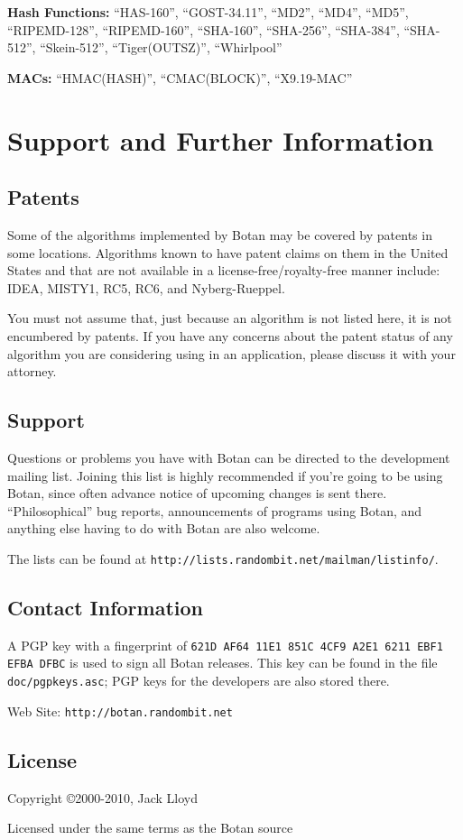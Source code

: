 \documentclass{article}
\newcommand{\filename}[1]{\texttt{#1}}
\newcommand{\url}[1]{\texttt{#1}}
\begin{document}
\noindent
\textbf{Hash Functions:} ``HAS-160'', ``GOST-34.11'',
``MD2'', ``MD4'', ``MD5'', ``RIPEMD-128'', ``RIPEMD-160'',
``SHA-160'', ``SHA-256'', ``SHA-384'', ``SHA-512'', ``Skein-512'',
``Tiger(OUTSZ)'', ``Whirlpool''

\noindent
\textbf{MACs:} ``HMAC(HASH)'', ``CMAC(BLOCK)'', ``X9.19-MAC''

\section{Support and Further Information}

\subsection{Patents}

Some of the algorithms implemented by Botan may be covered by patents in some
locations. Algorithms known to have patent claims on them in the United States
and that are not available in a license-free/royalty-free manner include:
IDEA, MISTY1, RC5, RC6, and Nyberg-Rueppel.

You must not assume that, just because an algorithm is not listed here, it is
not encumbered by patents. If you have any concerns about the patent status of
any algorithm you are considering using in an application, please discuss it
with your attorney.

\subsection{Support}

Questions or problems you have with Botan can be directed to the
development mailing list. Joining this list is highly recommended if
you're going to be using Botan, since often advance notice of upcoming
changes is sent there. ``Philosophical'' bug reports, announcements of
programs using Botan, and anything else having to do with Botan are
also welcome.

The lists can be found at
\url{http://lists.randombit.net/mailman/listinfo/}.

\subsection{Contact Information}

A PGP key with a fingerprint of
\verb|621D AF64 11E1 851C 4CF9 A2E1 6211 EBF1 EFBA DFBC| is used to sign all
Botan releases. This key can be found in the file \filename{doc/pgpkeys.asc};
PGP keys for the developers are also stored there.

\vskip 5pt \noindent
Web Site: \url{http://botan.randombit.net}

\subsection{License}

Copyright \copyright  2000-2010, Jack Lloyd

Licensed under the same terms as the Botan source
\end{document}
